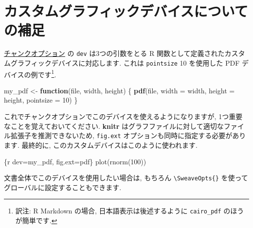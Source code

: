 \documentclass[
  lualatex,ja=standard,jafont=noto-otf]{bxjsreport}
\newenvironment{Shaded}{\begin{snugshade}}{\end{snugshade}}
\newcommand{\AttributeTok}[1]{\textcolor[rgb]{0.13,0.29,0.53}{#1}}
\newcommand{\ControlFlowTok}[1]{\textcolor[rgb]{0.13,0.29,0.53}{\textbf{#1}}}
\newcommand{\DecValTok}[1]{\textcolor[rgb]{0.00,0.00,0.81}{#1}}
\newcommand{\FunctionTok}[1]{\textcolor[rgb]{0.13,0.29,0.53}{\textbf{#1}}}
\newcommand{\NormalTok}[1]{#1}
\newcommand{\OtherTok}[1]{\textcolor[rgb]{0.56,0.35,0.01}{#1}}
\newcommand{\StringTok}[1]{\textcolor[rgb]{0.31,0.60,0.02}{#1}}
\begin{document}
\hypertarget{ux30abux30b9ux30bfux30e0ux30b0ux30e9ux30d5ux30a3ux30c3ux30afux30c7ux30d0ux30a4ux30b9ux306bux3064ux3044ux3066ux306eux88dcux8db3}{%
\section*{カスタムグラフィックデバイスについての補足}\label{ux30abux30b9ux30bfux30e0ux30b0ux30e9ux30d5ux30a3ux30c3ux30afux30c7ux30d0ux30a4ux30b9ux306bux3064ux3044ux3066ux306eux88dcux8db3}}

\protect\hyperlink{options}{チャンクオプション} の \texttt{dev}
は3つの引数をとる R
関数として定義されたカスタムグラフィックデバイスに対応します. これは
\texttt{pointsize} 10 を使用した PDF デバイスの例です\footnote{訳注: R
  Markdown の場合, 日本語表示は後述するように \texttt{cairo\_pdf}
  のほうが簡単です.}.

\begin{Shaded}
\begin{Highlighting}[numbers=left,,]
\NormalTok{my\_pdf }\OtherTok{\textless{}{-}} \ControlFlowTok{function}\NormalTok{(file, width, height) \{}
  \FunctionTok{pdf}\NormalTok{(file, }\AttributeTok{width =}\NormalTok{ width, }\AttributeTok{height =}\NormalTok{ height, }\AttributeTok{pointsize =} \DecValTok{10}\NormalTok{)}
\NormalTok{\}}
\end{Highlighting}
\end{Shaded}

これでチャンクオプションでこのデバイスを使えるようになりますが,
1つ重要なことを覚えておいてください. \textbf{knitr}
はグラフファイルに対して適切なファイル拡張子を推測できないため,
\texttt{fig.ext} オプションも同時に指定する必要があります. 最終的に,
このカスタムデバイスはこのように使われます.

\begin{Shaded}
\begin{Highlighting}[]
\StringTok{\textasciigrave{}\textasciigrave{}\textasciigrave{}}\AttributeTok{\{r dev=\textquotesingle{}my\_pdf\textquotesingle{}, fig.ext=\textquotesingle{}pdf\textquotesingle{}\}}
\AttributeTok{plot(rnorm(100))}
\StringTok{\textasciigrave{}\textasciigrave{}\textasciigrave{}}
\end{Highlighting}
\end{Shaded}

文書全体でこのデバイスを使用したい場合は, もちろん
\texttt{\textbackslash{}SweaveOpts\{\}}
を使ってグローバルに設定することもできます.
\end{document}
